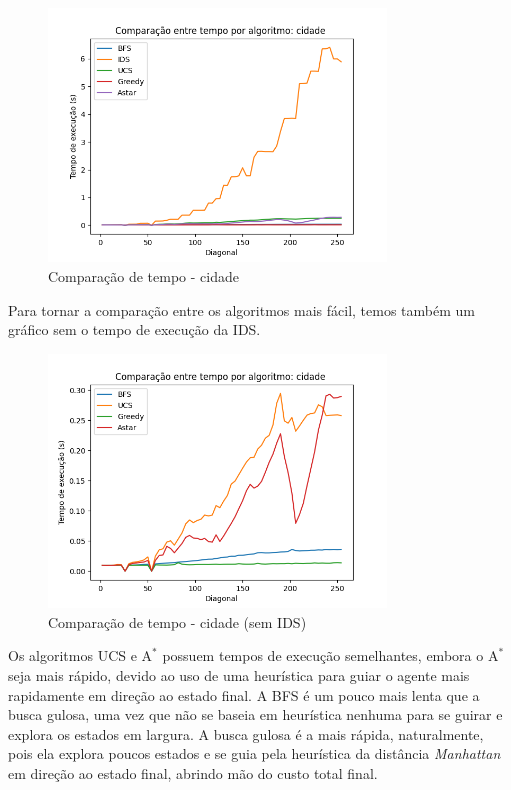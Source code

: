 \documentclass{article}
\begin{document}
\begin{figure}[H]
	\centering
	\includegraphics[width=0.8\textwidth]{../images/cidade_time_benchmark.png}
	\caption{Comparação de tempo - cidade}
\end{figure}

Para tornar a comparação entre os algoritmos mais fácil, temos também um gráfico sem o tempo de execução da IDS.

\begin{figure}[H]
	\centering
	\includegraphics[width=0.8\textwidth]{../images/cidade_time_NOIDS_benchmark.png}
	\caption{Comparação de tempo - cidade (sem IDS)}
\end{figure}

Os algoritmos UCS e \(\text{A}^*\) possuem tempos de execução semelhantes,
embora o \(\text{A}^*\) seja mais rápido, devido ao uso de uma heurística para guiar o agente mais rapidamente em direção ao estado final. A BFS é um pouco mais lenta que a busca gulosa, uma vez que não se baseia em heurística nenhuma
para se guirar e explora os estados em largura. A busca gulosa é a mais rápida, naturalmente, pois ela explora poucos estados e se guia pela heurística da distância \textit{Manhattan} em direção ao estado final, abrindo mão
do custo total final.
\end{document}
